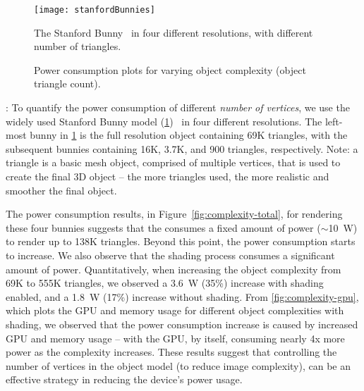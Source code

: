 
\begin{figure}[t]
    \centering
    \texttt{[image: stanfordBunnies]}
    \caption{The Stanford Bunny~\cite{bunny} in four different resolutions, 
            with different number of triangles. 
            }
    \label{fig:bunny}
\end{figure}


\begin{figure}[t]
    \centering
    \vspace{-1ex}
    \hfill
    \vspace{-2ex}
    \caption{Power consumption plots for varying object complexity (object triangle count).}
    \label{fig:complexity}
\end{figure}





:
%
To quantify the power consumption of different \emph{number of vertices},
we use the widely used Stanford Bunny model (\fig\ref{fig:bunny})~\cite{bunny} in four different resolutions. The left-most bunny in \fig\ref{fig:bunny} is
the full resolution object containing 69K triangles, with the subsequent 
bunnies containing 16K, 3.7K, and 900 triangles, respectively. Note: a triangle is a basic mesh object, comprised of multiple vertices, that is used to create the final 3D object -- the more triangles used, the more realistic and smoother the final object.


The power consumption results, in Figure~\ref{fig:complexity-total}, for rendering these four bunnies suggests that the {\mlo} consumes a fixed amount of power ($\sim$10~W) to render up to 138K triangles. Beyond this point, the 
power consumption starts to increase. We also observe that the shading process consumes a significant amount of power. Quantitatively, when increasing the object complexity from 69K to 555K triangles, we observed a 3.6~W (35\%) increase with shading enabled, and a 1.8~W (17\%) increase without shading. From 
\fig\ref{fig:complexity-gpu}, which plots the GPU and memory usage 
for different object complexities with shading, we observed that the power consumption increase is caused by increased GPU and memory usage -- with the GPU, by itself, consuming nearly 4x more power as the complexity increases. These results suggest that controlling the number of vertices in the object model (to reduce image complexity), can be an effective strategy in reducing the device's power usage.


